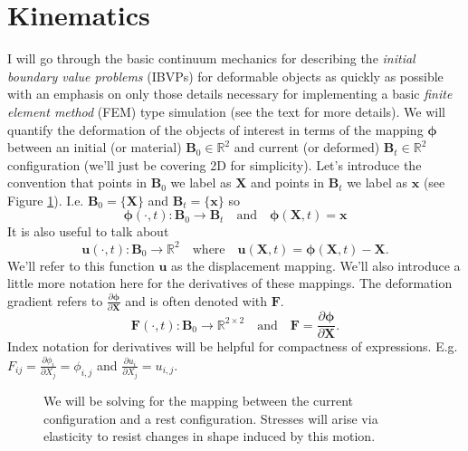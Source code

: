 
\section*{Kinematics}

I will go through the basic continuum mechanics for describing the \emph{initial boundary value problems} (IBVPs) for deformable objects as quickly as possible with an emphasis on only those details necessary for implementing a basic \emph{finite element method} (FEM) type simulation (see the text \cite{BW08} for more details). We will quantify the deformation of the objects of interest in terms of the mapping $\boldsymbol{\phi}$ between an initial (or material) $\mathbf{B}_0\in\mathbb{R}^2$ and current (or deformed) $\mathbf{B}_t\in\mathbb{R}^2$ configuration (we'll just be covering 2D for simplicity). Let's introduce the convention that points in $\mathbf{B}_0$ we label as $\mathbf{X}$ and points in $\mathbf{B}_t$ we label as $\mathbf{x}$ (see Figure \ref{fig:phi}). I.e. $\mathbf{B}_0=\{\mathbf{X}\}$ and $\mathbf{B}_t=\{\mathbf{x}\}$ so
\begin{equation*}
\boldsymbol{\phi}(\cdot,t) \colon \mathbf{B}_0 \to \mathbf{B}_t \quad \text{and} \quad \boldsymbol{\phi}(\mathbf{X},t) = \mathbf{x}
\end{equation*}
It is also useful to talk about
\begin{equation*}
\mathbf{u}(\cdot,t) \colon \mathbf{B}_0 \to \mathbb{R}^2 \quad \text{where} \quad \mathbf{u}(\mathbf{X},t) = \boldsymbol{\phi}(\mathbf{X},t)-\mathbf{X}.
\end{equation*}
We'll refer to this function $\mathbf{u}$ as the displacement mapping. We'll also introduce a little more notation here for the derivatives of these mappings. The deformation gradient refers to $\frac{\partial\boldsymbol{\phi}}{\partial\mathbf{X}}$ and is often denoted with $\mathbf{F}$.
\begin{equation*}
\mathbf{F}(\cdot,t) \colon \mathbf{B}_0 \to \mathbb{R}^{2\times2} \quad \text{and} \quad \mathbf{F} = \frac{\partial\boldsymbol{\phi}}{\partial\mathbf{X}}.
\end{equation*}
Index notation for derivatives will be helpful for compactness of expressions. E.g. $F_{ij} = \frac{\partial\phi_i}{\partial X_j} = \phi_{i,j}$ and $\frac{\partial u_i}{\partial X_j} = u_{i,j}$.
\begin{figure}
\caption{We will be solving for the mapping between the current configuration and a rest configuration. Stresses will arise via elasticity to resist changes in shape induced by this motion.}
\label{fig:phi}
\end{figure}

